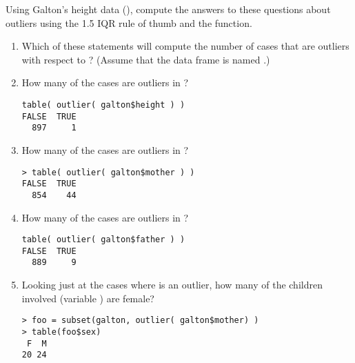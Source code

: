 

Using Galton's height data (), compute the answers to these
questions about outliers using the 1.5 IQR rule of
thumb and the  function.

\begin{enumerate}
\item Which of these statements will compute the number of cases that
  are outliers with respect to ?  (Assume that the data
  frame is named .)
\begin{MultipleChoice}
\end{MultipleChoice}


\item How many of the cases are outliers in  ?\\

\begin{AnswerText}
\begin{verbatim}
table( outlier( galton$height ) )
FALSE  TRUE 
  897     1 
\end{verbatim}
\end{AnswerText}

\item How many of the cases are outliers in ?\\

\begin{AnswerText}
\begin{verbatim}
> table( outlier( galton$mother ) )
FALSE  TRUE 
  854    44 
\end{verbatim}
\end{AnswerText}

\item How many of the cases are outliers in ?

\begin{AnswerText}
\begin{verbatim}
table( outlier( galton$father ) )
FALSE  TRUE 
  889     9 
\end{verbatim}
\end{AnswerText}


\item Looking just at the cases where  is an outlier, how
  many of the children involved (variable ) are female?\\

\begin{AnswerText}
\begin{verbatim}
> foo = subset(galton, outlier( galton$mother) ) 
> table(foo$sex)
 F  M 
20 24 
\end{verbatim}
\end{AnswerText}


\end{enumerate}

